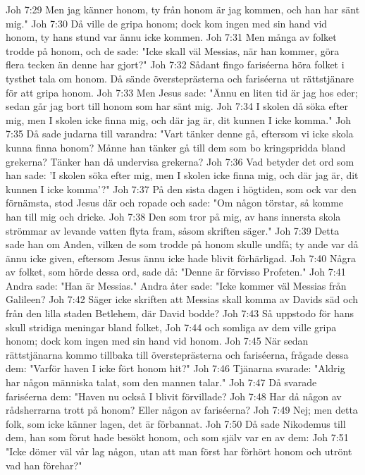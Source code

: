 Joh 7:29  Men jag känner honom, ty från honom är jag kommen, och han har sänt mig."
Joh 7:30  Då ville de gripa honom; dock kom ingen med sin hand vid honom, ty hans stund var ännu icke kommen.
Joh 7:31  Men många av folket trodde på honom, och de sade: "Icke skall väl Messias, när han kommer, göra flera tecken än denne har gjort?"
Joh 7:32  Sådant fingo fariséerna höra folket i tysthet tala om honom. Då sände översteprästerna och fariséerna ut rättstjänare för att gripa honom.
Joh 7:33  Men Jesus sade: "Ännu en liten tid är jag hos eder; sedan går jag bort till honom som har sänt mig.
Joh 7:34  I skolen då söka efter mig, men I skolen icke finna mig, och där jag är, dit kunnen I icke komma."
Joh 7:35  Då sade judarna till varandra: "Vart tänker denne gå, eftersom vi icke skola kunna finna honom? Månne han tänker gå till dem som bo kringspridda bland grekerna? Tänker han då undervisa grekerna?
Joh 7:36  Vad betyder det ord som han sade: 'I skolen söka efter mig, men I skolen icke finna mig, och där jag är, dit kunnen I icke komma'?"
Joh 7:37  På den sista dagen i högtiden, som ock var den förnämsta, stod Jesus där och ropade och sade: "Om någon törstar, så komme han till mig och dricke.
Joh 7:38  Den som tror på mig, av hans innersta skola strömmar av levande vatten flyta fram, såsom skriften säger."
Joh 7:39  Detta sade han om Anden, vilken de som trodde på honom skulle undfå; ty ande var då ännu icke given, eftersom Jesus ännu icke hade blivit förhärligad.
Joh 7:40  Några av folket, som hörde dessa ord, sade då: "Denne är förvisso Profeten."
Joh 7:41  Andra sade: "Han är Messias." Andra åter sade: "Icke kommer väl Messias från Galileen?
Joh 7:42  Säger icke skriften att Messias skall komma av Davids säd och från den lilla staden Betlehem, där David bodde?
Joh 7:43  Så uppstodo för hans skull stridiga meningar bland folket,
Joh 7:44  och somliga av dem ville gripa honom; dock kom ingen med sin hand vid honom.
Joh 7:45  När sedan rättstjänarna kommo tillbaka till översteprästerna och fariséerna, frågade dessa dem: "Varför haven I icke fört honom hit?"
Joh 7:46  Tjänarna svarade: "Aldrig har någon människa talat, som den mannen talar."
Joh 7:47  Då svarade fariséerna dem: "Haven nu också I blivit förvillade?
Joh 7:48  Har då någon av rådsherrarna trott på honom? Eller någon av fariséerna?
Joh 7:49  Nej; men detta folk, som icke känner lagen, det är förbannat.
Joh 7:50  Då sade Nikodemus till dem, han som förut hade besökt honom, och som själv var en av dem:
Joh 7:51  "Icke dömer väl vår lag någon, utan att man först har förhört honom och utrönt vad han förehar?"
